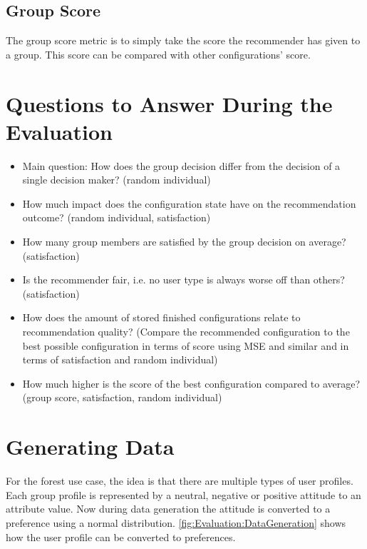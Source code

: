 \subsection{Group Score}
The group score metric is to simply take the score the recommender has given to a group. This score can be compared with other configurations' score.


\section{Questions to Answer During the Evaluation}
\label{sec:Evaluation:Questions}

\begin{itemize}
    \item Main question: How does the group decision differ from the decision of a single decision maker? (random individual)
    \item How much impact does the configuration state have on the recommendation outcome? (random individual, satisfaction)
    \item How many group members are satisfied by the group decision on average? (satisfaction)
    \item Is the recommender fair, i.e. no user type is always worse off than others? (satisfaction)
    \item How does the amount of stored finished configurations relate to recommendation quality? (Compare the recommended configuration to the best possible configuration in terms of score using MSE and similar and in terms of satisfaction and random individual) 
    \item How much higher is the score of the best configuration compared to average? (group score, satisfaction, random individual)
\end{itemize}

\section{Generating Data}
\label{sec:Evaluation:GeneratingGroups}

For the forest use case, the idea is that there are multiple types of user profiles. Each group profile is represented by a neutral, negative or positive attitude to an attribute value. Now during data generation the attitude is converted to a preference using a normal distribution. \autoref{fig:Evaluation:DataGeneration} shows how the user profile can be converted to preferences.

